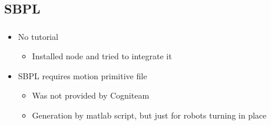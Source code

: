 \documentclass[numberofslides]{AMSBeamer}
\begin{document}
\subsection{SBPL}
\begin{frame}[label=sbpl]
	\frametitle{\insertsectionhead}%
    \begin{minipage}{0.7\textwidth}
        \textbf{\insertsubsectionhead}
        \begin{itemize}
            \item No tutorial
            \begin{itemize}
                \item Installed node and tried to integrate it
            \end{itemize}
            \item SBPL requires motion primitive file
            \begin{itemize}
                \item Was not provided by Cogniteam
                \item Generation by matlab script, but just for robots turning in place
            \end{itemize}
        \end{itemize}
    \end{minipage}%
    \begin{minipage}{0.3\textwidth}
        \begin{figure}

\end{figure}
\end{minipage}
\end{frame}
\end{document}
